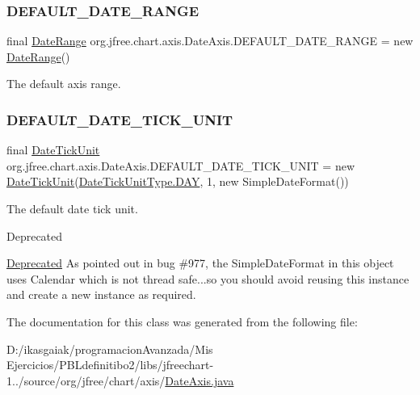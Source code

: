 \subsubsection{\texorpdfstring{D\+E\+F\+A\+U\+L\+T\+\_\+\+D\+A\+T\+E\+\_\+\+R\+A\+N\+GE}{DEFAULT\_DATE\_RANGE}}
{\footnotesize\ttfamily final \mbox{\hyperlink{classorg_1_1jfree_1_1data_1_1time_1_1_date_range}{Date\+Range}} org.\+jfree.\+chart.\+axis.\+Date\+Axis.\+D\+E\+F\+A\+U\+L\+T\+\_\+\+D\+A\+T\+E\+\_\+\+R\+A\+N\+GE = new \mbox{\hyperlink{classorg_1_1jfree_1_1data_1_1time_1_1_date_range}{Date\+Range}}()\hspace{0.3cm}{\ttfamily [static]}}

The default axis range. \mbox{\label{classorg_1_1jfree_1_1chart_1_1axis_1_1_date_axis_a5a192f3d8326fa7480a78571627b7809}} 
\subsubsection{\texorpdfstring{D\+E\+F\+A\+U\+L\+T\+\_\+\+D\+A\+T\+E\+\_\+\+T\+I\+C\+K\+\_\+\+U\+N\+IT}{DEFAULT\_DATE\_TICK\_UNIT}}
{\footnotesize\ttfamily final \mbox{\hyperlink{classorg_1_1jfree_1_1chart_1_1axis_1_1_date_tick_unit}{Date\+Tick\+Unit}} org.\+jfree.\+chart.\+axis.\+Date\+Axis.\+D\+E\+F\+A\+U\+L\+T\+\_\+\+D\+A\+T\+E\+\_\+\+T\+I\+C\+K\+\_\+\+U\+N\+IT = new \mbox{\hyperlink{classorg_1_1jfree_1_1chart_1_1axis_1_1_date_tick_unit}{Date\+Tick\+Unit}}(\mbox{\hyperlink{classorg_1_1jfree_1_1chart_1_1axis_1_1_date_tick_unit_type_a26b629f36cb016fb5efddebd100fb4a1}{Date\+Tick\+Unit\+Type.\+D\+AY}}, 1, new Simple\+Date\+Format())\hspace{0.3cm}{\ttfamily [static]}}

The default date tick unit.

\begin{DoxyRefDesc}{Deprecated}
\item[\mbox{\hyperlink{deprecated__deprecated000003}{Deprecated}}]As pointed out in bug \#977, the Simple\+Date\+Format in this object uses Calendar which is not thread safe...so you should avoid reusing this instance and create a new instance as required. \end{DoxyRefDesc}


The documentation for this class was generated from the following file\+:\begin{DoxyCompactItemize}
\item 
D\+:/ikasgaiak/programacion\+Avanzada/\+Mis Ejercicios/\+P\+B\+Ldefinitibo2/libs/jfreechart-\/1../source/org/jfree/chart/axis/\mbox{\hyperlink{_date_axis_8java}{Date\+Axis.\+java}}\end{DoxyCompactItemize}
